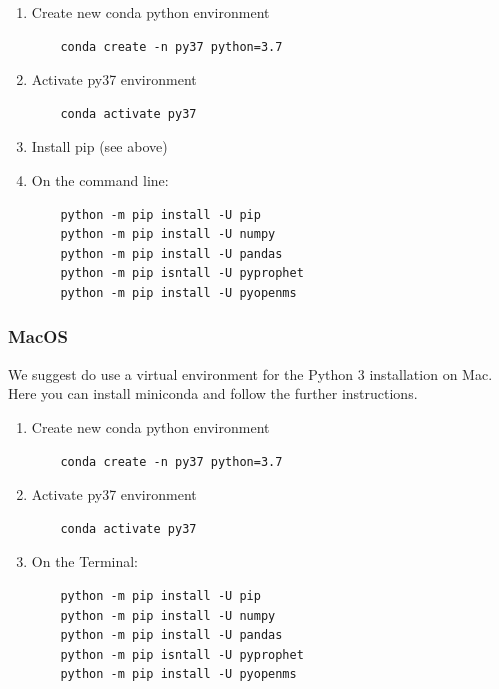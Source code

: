 \begin{enumerate}
  \item Create new conda python environment
    \begin{listing}
\begin{verbatim}
    conda create -n py37 python=3.7
    \end{verbatim}
\end{listing} 
    \item Activate py37 environment
    \begin{listing}
\begin{verbatim}
    conda activate py37
    \end{verbatim}
\end{listing} 
  \item Install pip (see above)
  \item On the command line:
    \begin{listing}
\begin{verbatim}
    python -m pip install -U pip
    python -m pip install -U numpy
    python -m pip install -U pandas
    python -m pip isntall -U pyprophet
    python -m pip install -U pyopenms
    \end{verbatim}
\end{listing}
\end{enumerate}

\subsubsection{MacOS}
We suggest do use a virtual environment for the Python 3 installation on Mac. 
Here you can install miniconda and follow the further instructions. \\

\begin{enumerate}
  \item Create new conda python environment
    \begin{listing}
\begin{verbatim}
    conda create -n py37 python=3.7
    \end{verbatim}
\end{listing} 
    \item Activate py37 environment
    \begin{listing}
\begin{verbatim}
    conda activate py37
    \end{verbatim}
\end{listing} 
  \item On the Terminal:
    \begin{listing}
\begin{verbatim}
    python -m pip install -U pip
    python -m pip install -U numpy
    python -m pip install -U pandas
    python -m pip isntall -U pyprophet
    python -m pip install -U pyopenms
    \end{verbatim}
\end{listing}
\end{enumerate}

